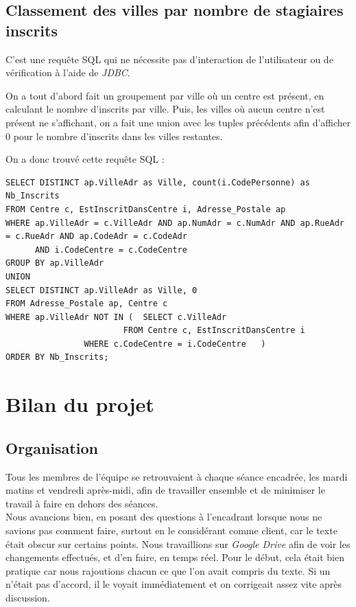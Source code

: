 \documentclass[10pt]{article}
\begin{document}
\subsection{Classement des villes par nombre de stagiaires inscrits}

C'est une requête SQL qui ne nécessite pas d'interaction de l'utilisateur ou de vérification à l'aide de \emph{JDBC}. 

On a tout d'abord fait un groupement par ville où un centre est présent, en calculant le nombre d'inscrits par ville.
Puis, les villes où aucun centre n'est présent ne s'affichant, on a fait une union avec les tuples précédents afin d'afficher $0$ 
pour le nombre d'inscrits dans les villes restantes.

On a donc trouvé cette requête SQL :

\begin{small}
\begin{verbatim}
SELECT DISTINCT ap.VilleAdr as Ville, count(i.CodePersonne) as Nb_Inscrits
FROM Centre c, EstInscritDansCentre i, Adresse_Postale ap
WHERE ap.VilleAdr = c.VilleAdr AND ap.NumAdr = c.NumAdr AND ap.RueAdr = c.RueAdr AND ap.CodeAdr = c.CodeAdr 
      AND i.CodeCentre = c.CodeCentre
GROUP BY ap.VilleAdr
UNION
SELECT DISTINCT ap.VilleAdr as Ville, 0
FROM Adresse_Postale ap, Centre c
WHERE ap.VilleAdr NOT IN (	SELECT c.VilleAdr
      		      	 	FROM Centre c, EstInscritDansCentre i
				WHERE c.CodeCentre = i.CodeCentre	)
ORDER BY Nb_Inscrits;
\end{verbatim}
\end{small}

\section{Bilan du projet}

\subsection{Organisation}

Tous les membres de l'équipe se retrouvaient à chaque séance encadrée, les mardi matins et vendredi après-midi, afin de travailler 
ensemble et de minimiser le travail à faire en dehors des séances.\\

Nous avancions bien, en posant des questions à l'encadrant lorsque nous ne savions pas comment faire, surtout en le considérant comme
client, car le texte était obscur sur certains points. 
Nous travaillions sur \emph{Google Drive} afin de voir les changements effectués, et d'en faire, en temps réel. Pour le début, cela était
bien pratique car nous rajoutions chacun ce que l'on avait compris du texte. Si un n'était pas d'accord, il le voyait immédiatement et
on corrigeait assez vite après discussion. \\
\end{document}
